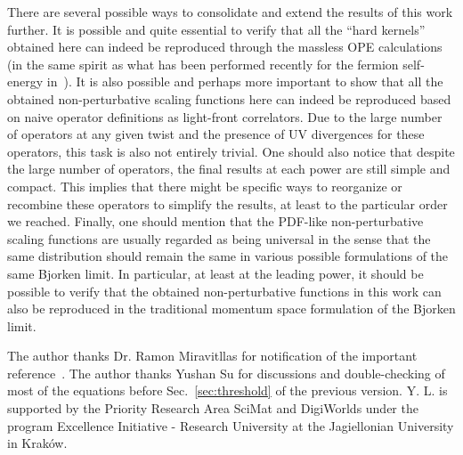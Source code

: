 \documentclass[a4paper,11pt]{article}
\begin{document}
There are several possible ways to consolidate and extend the results of this work further. It is possible and quite essential to verify that all the ``hard kernels'' obtained here can indeed be reproduced through the massless OPE calculations (in the same spirit as what has been performed recently for the fermion self-energy in~\cite{Marino:2024uco}). It is also possible and perhaps more important to show that all the obtained non-perturbative scaling functions here can indeed be reproduced based on naive operator definitions as light-front correlators. Due to the large number of operators at any given twist and the presence of UV divergences for these operators, this task is also not entirely trivial. One should also notice that despite the large number of operators, the final results at each power are still simple and compact. This implies that there might be specific ways to reorganize or recombine these operators to simplify the results, at least to the particular order we reached. Finally, one should mention that the PDF-like non-perturbative scaling functions are usually regarded as being universal in the sense that the same distribution should remain the same in various possible formulations of the same Bjorken limit. In particular, at least at the leading power,  it should be possible to verify that the obtained non-perturbative functions in this work can also be reproduced in the traditional momentum space formulation of the Bjorken limit. 




\acknowledgments
The author thanks Dr. Ramon Miravitllas for notification of the important reference~\cite{Beneke:1998eq}. The author thanks Yushan Su for discussions and double-checking of most of the equations before Sec.~\ref{sec:threshold} of the previous version. Y. L. is supported by the Priority Research Area SciMat and DigiWorlds under the program Excellence Initiative - Research University at the Jagiellonian University in Krak\'{o}w. 

\appendix










 

\end{document}
